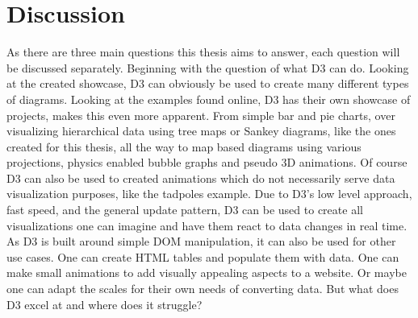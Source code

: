 \chapter{Discussion}

As there are three main questions this thesis aims to answer, each question will be discussed separately. Beginning with the question of what D3 can do. Looking at the created showcase, D3 can obviously be used to create many different types of diagrams. Looking at the examples found online, D3 has their own showcase of projects, makes this even more apparent. From simple bar and pie charts, over visualizing hierarchical data using tree maps or Sankey diagrams, like the ones created for this thesis, all the way to map based diagrams using various projections\cite{davies}, physics enabled bubble graphs\cite{carter_2012} and pseudo 3D animations\cite{davies_sphere}. Of course D3 can also be used to created animations which do not necessarily serve data visualization purposes, like the tadpoles example\cite{bostock_2020}. Due to D3's low level approach, fast speed, and the general update pattern, D3 can be used to create all visualizations one can imagine and have them react to data changes in real time. As D3 is built around simple DOM manipulation, it can also be used for other use cases. One can create HTML tables and populate them with data. One can make small animations to add visually appealing aspects to a website. Or maybe one can adapt the scales for their own needs of converting data. But what does D3 excel at and where does it struggle?

